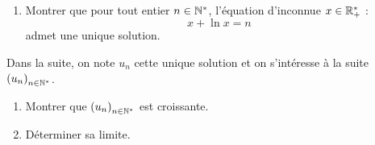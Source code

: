 \begin{corr}
\end{corr}

\begin{exo}[Exercice 14]
\begin{enumerate}[series=ex14suites]
\item Montrer que pour tout entier \(n\in\mathbb{N}^*\), l'équation d'inconnue \(x\in\mathbb{R}_+^*\) : \[x+\ln x=n\] admet une unique solution.
\end{enumerate}

Dans la suite, on note \(u_n\) cette unique solution et on s'intéresse à la suite \(\left(u_n\right)_{n\in\mathbb{N}^*}\).

\begin{enumerate}[resume=ex14suites]
\item Montrer que \(\left(u_n\right)_{n\in\mathbb{N}^*}\) est croissante. \\

\item Déterminer sa limite.
\end{enumerate}
\end{exo}

\begin{corr}
\end{corr}